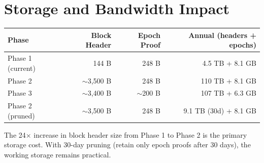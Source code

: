 \section{Storage and Bandwidth Impact}


\begin{center}
\begin{tabular}{lrrr}
\toprule
\textbf{Phase} & \textbf{Block Header} & \textbf{Epoch Proof} & \textbf{Annual (headers + epochs)} \\
\midrule
Phase 1 (current) & 144 B & 248 B & 4.5 TB + 8.1 GB \\
Phase 2 & $\sim$3,500 B & 248 B & 110 TB + 8.1 GB \\
Phase 3 & $\sim$3,400 B & $\sim$200 B & 107 TB + 6.3 GB \\
Phase 2 (pruned) & $\sim$3,500 B & 248 B & 9.1 TB (30d) + 8.1 GB \\
\bottomrule
\end{tabular}
\end{center}

The 24$\times$ increase in block header size from Phase 1 to Phase 2 is the primary storage cost. With 30-day pruning (retain only epoch proofs after 30 days), the working storage remains practical.

